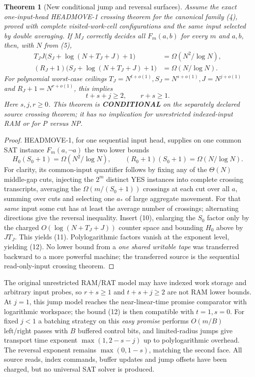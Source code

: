 \documentclass[11pt]{article}
\newtheorem{theorem}{Theorem}
\begin{document}
\begin{theorem}[New conditional jump and reversal surfaces]
Assume the exact one-input-head HEADMOVE-1 crossing theorem for the
canonical family (4), proved with complete visited-work-cell
configurations and the same input selected by double averaging. If
$M_J$ correctly decides all $F_m(a,b)$ for every $m$ and $a,b$,
then, with $N$ from (5),
\begin{align*}
 T_J J\bigl(S_J+\log(N+T_J+J)+1\bigr)
     &=\Omega(N^2/\log N),\\
 (R_J+1)\bigl(S_J+\log(N+T_J+J)+1\bigr)
     &=\Omega(N/\log N).                                  \tag{11}
\end{align*}
For polynomial worst-case ceilings
$T_J=N^{t+o(1)}, S_J=N^{s+o(1)},J=N^{j+o(1)}$ and
$R_J+1=N^{r+o(1)}$, this implies
\[
                 \boxed{t+s+j\ge2,\qquad r+s\ge1}.         \tag{12}
\]
Here $s,j,r\ge0$. This theorem is \textbf{CONDITIONAL}
on the separately declared source crossing theorem; it has
no implication for unrestricted indexed-input RAM or for P versus NP.
\end{theorem}
\begin{proof}
HEADMOVE-1, for one sequential input head, supplies on one common
SAT instance $F_m(a,\neg a)$ the two lower bounds
\[
 H_0(S_0+1)=\Omega(N^2/\log N),\qquad
 (R_0+1)(S_0+1)=\Omega(N/\log N).
\]
For clarity, its common-input quantifier follows by fixing any of
the $\Theta(N)$ middle-gap cuts, injecting the $2^m$ distinct YES
instances into complete crossing transcripts, averaging the
$\Omega(m/(S_0+1))$ crossings at each cut over all $a$, summing over
cuts and selecting one $a_*$ of large aggregate movement. For that
\emph{same} input some cut has at least the average number of
crossings; alternating directions give the reversal inequality.
Insert (10), enlarging the $S_0$ factor only by the charged
$O(\log(N+T_J+J))$ counter space and bounding $H_0$ above by
$JT_J$. This yields (11). Polylogarithmic factors vanish at the
exponent level, yielding (12). No lower bound from a
\emph{one shared writable tape} was transferred backward to a
more powerful machine; the transferred source is the sequential
read-only-input crossing theorem.
\end{proof}

The original unrestricted RAM/RAT model may have indexed work
storage and arbitrary input probes, so $r+s\ge1$ and
$t+s+j\ge2$ are not RAM lower bounds. At $j=1$, this jump
model reaches the near-linear-time promise comparator with logarithmic
workspace; the bound (12) is then compatible with $t=1,s=0$.
For fixed $j<1$ a batching strategy on this \emph{easy promise}
performs $O(m/B)$ left/right passes with $B$ buffered control
bits, and limited-radius jumps give transport time exponent
$\max(1,2-s-j)$ up to polylogarithmic overhead.
The reversal exponent remains $\max(0,1-s)$, matching the second
face. All source reads, index commands, buffer updates and jump
offsets have been charged, but no universal SAT solver is produced.
\end{document}
